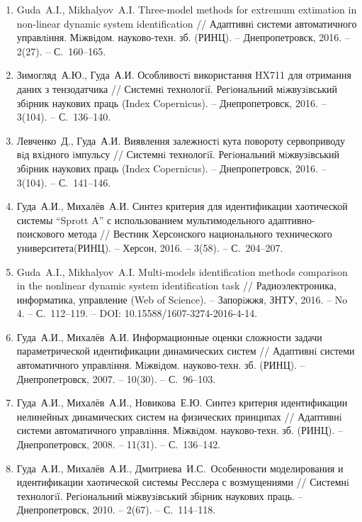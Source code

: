 \begin{enumerate}
\item
Guda~A.I., Mikhalyov~A.I. Three-model methods for extremum extimation in non-linear
dynamic system identification
// Адаптивнi системи автоматичного управлiння. Мiжвiдом. науково-техн. зб. (РИНЦ).
 -- Днепропетровск, 2016. -- 2(27). -- С.~160--165.

\item
Зимогляд~А.Ю., Гуда~А.И. Особливостi використання HX711 для отримання даних з
тензодатчика // Системнi технологiї. Регiональний мiжвузiвський збiрник наукових
праць (Index Copernicus). -- Днепропетровск, 2016. -- 3(104). -- С.~136--140.

\item
Левченко~Д., Гуда~А.И. Виявлення залежностi кута повороту сервоприводу вiд вхiдного
iмпульсу // Системнi технологiї. Регiональний мiжвузiвський збiрник наукових праць
(Index Copernicus). -- Днепропетровск, 2016. -- 3(104). -- С.~141--146.

\item
Гуда~А.И., Михалёв~А.И. Синтез критерия для идентификации хаотической системы
``Sprott A'' с использованием мультимодельного адаптивно-поискового метода //
Вестник Херсонского национального технического университета(РИНЦ). -- Херсон,
2016. -- 3(58). -- С.~204--207.

\item
Guda~A.I., Mikhalyov~A.I. Multi-models identification methods comparison in the nonlinear
dynamic system identification task // Радиоэлектроника, информатика, управление (Web of Science).
-- Запорiжжя, ЗНТУ, 2016. -- No 4. -- С.~112--119. -- DOI: 10.15588/1607-3274-2016-4-14.

\item
Гуда~А.И., Михалёв~А.И. Информационные оценки сложности задачи параметрической
идентификации динамических систем // Адаптивнi системи автоматичного
управлiння. Мiжвiдом. науково-техн. зб. (РИНЦ). -- Днепропетровск, 2007. -- 10(30). -- С.~96--103.

\item
Гуда~А.И., Михалёв~А.И., Новикова~Е.Ю. Синтез критерия идентификации нелинейных
динамических систем на физических принципах // Адаптивнi системи автоматичного управлiння.
Мiжвiдом. науково-техн. зб. (РИНЦ). -- Днепропетровск, 2008. --
11(31). -- С.~136--142.

\item
Гуда~А.И., Михалёв~А.И., Дмитриева~И.С.~Особенности моделирования и идентификации
хаотической системы Ресслера с возмущениями // Системнi технологiї. Регiональний мiжвузiвський збiрник наукових праць.
-- Днепропетровск, 2010. -- 2(67). -- С.~114--118.


\end{enumerate}
